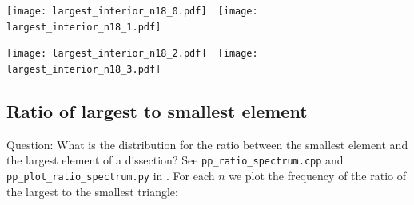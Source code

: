 \documentclass[12pt,amstags,fleqn]{article}
\theoremstyle{plain}
\theoremstyle{definition}
\begin{document}
\begin{center}
\texttt{[image: largest\_interior\_n18\_0.pdf]}~\hspace{2cm}~\texttt{[image: largest\_interior\_n18\_1.pdf]}
\end{center}

\begin{center}
\texttt{[image: largest\_interior\_n18\_2.pdf]}~\hspace{2cm}~\texttt{[image: largest\_interior\_n18\_3.pdf]}
\end{center}

\subsection{Ratio of largest to smallest element}

Question: What is the distribution for the ratio between the smallest element and
the largest element of a dissection? See \texttt{pp\_ratio\_spectrum.cpp} 
and \texttt{pp\_plot\_ratio\_spectrum.py} in \cite{githubrepo}. For each
$n$ we plot the frequency of the ratio of the largest to the smallest triangle:

\begin{center}
\end{center}

\begin{center}
\end{center}

\begin{center}
\end{center}

\begin{center}
\end{center}

\begin{center}
\end{center}

\begin{center}
\end{center}

\begin{center}
\end{center}
\end{document}
